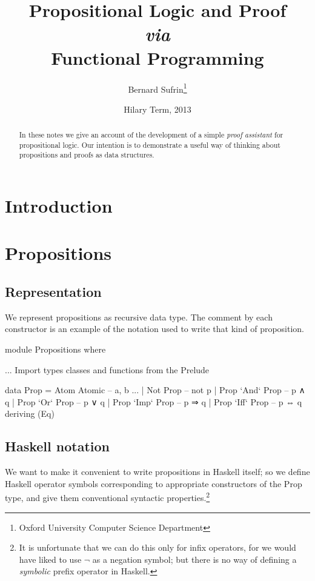 \documentclass[11pt]{article}
\title{Propositional Logic and Proof \\\textit{via}\\ Functional Programming}
\author{Bernard Sufrin\thanks{Oxford University Computer Science Department}}
\date{Hilary Term, 2013}
\begin{document}
\maketitle
\begin{abstract}
\noindent In these notes we give an account of the
development of a simple \textit{proof assistant} for
propositional logic. Our intention is to demonstrate a useful way of
thinking about propositions and proofs as data structures.
\end{abstract}

\tableofcontents

\newpage
\section{Introduction}

\section{Propositions}

\subsection{Representation}
We represent propositions as recursive data type. The
comment by each constructor is an example of the notation
used to write that kind of proposition.

\begin{code}[propositions.hs]
module Propositions where
  
  ... Import types classes and functions from the Prelude

  data Prop = Atom Atomic         -- a, b ...
            | Not  Prop           -- not p
            | Prop `And` Prop     -- p ∧ q
            | Prop `Or`  Prop     -- p ∨ q
            | Prop `Imp` Prop     -- p ⇒ q
            | Prop `Iff` Prop     -- p ⇔ q
            deriving (Eq)
\end{code}

\subsection{Haskell notation}
We want to make it convenient to write propositions in Haskell itself; so we 
define Haskell operator symbols corresponding to appropriate
constructors of the \textsf{Prop} type, and give them conventional
syntactic properties.\footnote{It is unfortunate that
we can do this only for infix operators, for we would
have liked to use $\lnot$ as a negation symbol; but there is
no way of defining a \textit{symbolic} prefix operator in Haskell.} 
\end{document}
